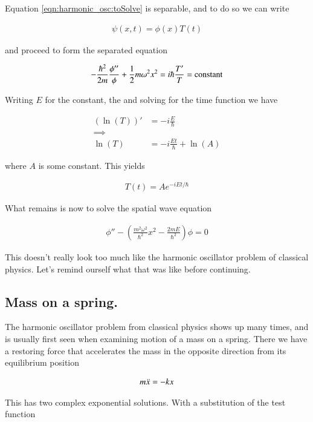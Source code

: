 Equation \ref{eqn:harmonic_osc:toSolve} is separable, and to do so we can write

\begin{align*}
\psi(x,t) = \phi(x) T(t)
\end{align*}

and proceed to form the separated equation

\begin{align*}
-\frac{\hbar^2}{2m} \frac{\phi''}{\phi} + \frac{1}{2} m \omega^2 x^2 = i \hbar \frac{T'}{T} = \text{constant}
\end{align*}

Writing $E$ for the constant, the and solving for the time function we have

\begin{align*}
(\ln(T))' &= -i \frac{E}{\hbar} \\
\implies \\
\ln(T) &= -i \frac{Et}{\hbar} + \ln(A)
\end{align*}

where $A$ is some constant.  This yields

\begin{align*}
T(t) = A e^{ -i E t/\hbar }
\end{align*}

What remains is now to solve the spatial wave equation

\begin{align}\label{eqn:harmonic_osc:spatial}
\phi'' - \left( \frac{m^2 \omega^2}{\hbar^2} x^2 - \frac{2m E}{\hbar^2}\right) \phi = 0
\end{align}

This doesn't really look too much like the harmonic oscillator problem of classical physics.  Let's remind ourself
what that was like before continuing.

\subsection{Mass on a spring. }

The harmonic oscillator problem from classical physics
shows up many times, and is usually first seen when examining motion
of a mass on a spring.  There we have a restoring force that accelerates the
mass in the opposite direction from its equilibrium position

\begin{align}
m \ddot{x} = -k x
\end{align}

This has two complex exponential solutions.  With a substitution of the test function

